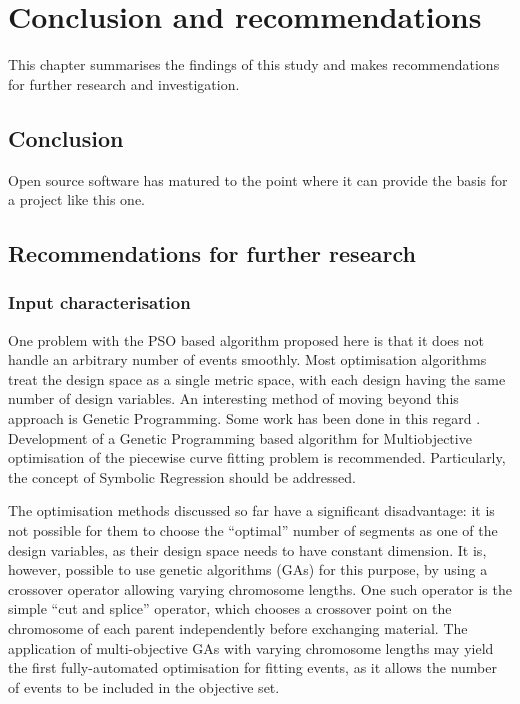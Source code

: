\chapter{Conclusion and recommendations}\label{chap:conclusion}
\begin{overview}
  This chapter summarises the findings of this study and makes
  recommendations for further research and investigation.
\end{overview}

\section{Conclusion}
Open source software has matured to the point where it can provide the basis for a project like this one.

\section{Recommendations for further research}
\label{sec:furtherresearch}
\subsection{Input characterisation}
One problem with the PSO based algorithm proposed here is that it does not handle an arbitrary number of events smoothly.  
Most optimisation algorithms treat the design space as a single metric space, with each design having the same number of design variables.  
An interesting method of moving beyond this approach is Genetic Programming.  
Some work has been done in this regard \citehere.  
Development of a Genetic Programming based algorithm for Multiobjective optimisation of the piecewise curve fitting problem is recommended.  
Particularly, the concept of Symbolic Regression should be addressed.

The optimisation methods discussed so far have a significant disadvantage: it is not possible for them to choose the ``optimal'' number of segments as one of the design variables, as their design space needs to have constant dimension. 
It is, however, possible to use genetic algorithms (GAs) for this purpose, by using a crossover operator allowing varying chromosome lengths. 
One such operator is the simple ``cut and splice'' operator, which chooses a crossover point on the chromosome of each parent independently before exchanging material.
The application of multi-objective GAs with varying chromosome lengths may yield the first fully-automated optimisation for fitting events, as it allows the number of events to be included in the objective set.

